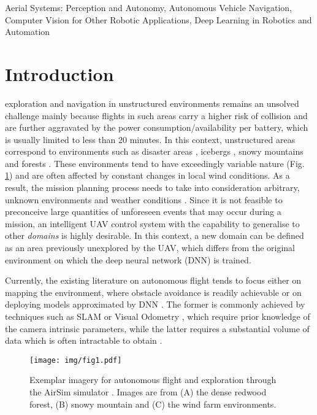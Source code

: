 \documentclass[letterpaper, 10 pt, journal, twoside]{IEEEtran}
\begin{document}
\begin{IEEEkeywords}
    Aerial Systems: Perception and Autonomy, Autonomous Vehicle Navigation, 
    Computer Vision for Other Robotic Applications, Deep Learning in Robotics and Automation
\end{IEEEkeywords}

\IEEEpeerreviewmaketitle

     \section{Introduction}

 exploration and navigation in unstructured environments remains an unsolved challenge mainly because flights in such areas carry a higher risk of collision and are further aggravated by the power consumption/availability per battery, which is usually limited to less than 20 minutes. In this context, unstructured areas correspond to environments such as disaster areas \cite{adams2011survey}, icebergs \cite{carlson2018adapting}, snowy mountains \cite{karaca2018potential} and forests \cite{Chiara2017Forestry}. These environments tend to have exceedingly variable nature (Fig. \ref{fig:testing_set}) and are often affected by constant changes in local wind conditions. As a result, the mission planning process needs to take into consideration arbitrary, unknown environments and weather conditions \cite{Sebbane2018IntelligentUAV}. Since it is not feasible to preconceive large quantities of unforeseen events that may occur during a mission, an intelligent UAV control system with the capability to generalise to other \textit{domains} is highly desirable. In this context, a new domain can be defined as an area previously unexplored by the UAV, which differs from the original environment on which the deep neural network (DNN) is trained. 

Currently, the existing literature on autonomous flight tends to focus either on mapping the environment, where obstacle avoidance is readily achievable or on deploying models approximated by DNN \cite{Kanellakis2017SurveyTrends}. The former is commonly achieved by techniques such as SLAM or Visual Odometry \cite{perez2018architecture}, which require prior knowledge of the camera intrinsic parameters, while the latter requires a substantial volume of data which is often intractable to obtain \cite{Kanellakis2017SurveyTrends, hentati2018simulation}. 

\begin{figure}
    \centering
\texttt{[image: img/fig1.pdf]}
    \caption{
        Exemplar imagery for autonomous flight and exploration through the AirSim simulator \cite{airsim2017fsr}. Images are from (A) the dense redwood forest, (B) snowy mountain and (C) the wind farm environments.
    }
    \label{fig:testing_set}\vspace{-0.7cm}
\end{figure}
\end{document}
